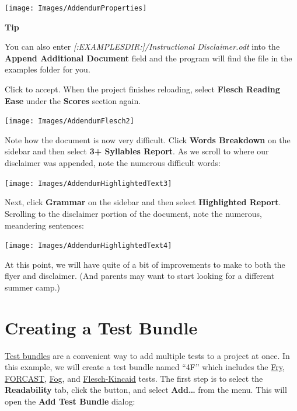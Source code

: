 \documentclass[
]{book}
\newenvironment{tipsection}
    {
    \begin{tcolorbox}[colframe=lightgray,colback=lightyellow,arc=3mm]
    \faLightbulb[regular] \textbf{Tip} \newline
    }
    {
    \end{tcolorbox}
    }
\theoremstyle{definition}
\theoremstyle{definition}
\theoremstyle{definition}
\theoremstyle{definition}
\theoremstyle{remark}
\begin{document}
\begin{center}\texttt{[image: Images/AddendumProperties]} \end{center}

\begin{tipsection}
You can also enter \emph{{[}:EXAMPLESDIR:{]}/Instructional Disclaimer.odt} into the \textbf{Append Additional Document} field and the program will find the file in the examples folder for you.

\end{tipsection}

Click  to accept. When the project finishes reloading, select \textbf{Flesch Reading Ease} under the \textbf{Scores} section again.

\begin{center}\texttt{[image: Images/AddendumFlesch2]} \end{center}

Note how the document is now very difficult. Click \textbf{Words Breakdown} on the sidebar and then select \textbf{3+ Syllables Report}. As we scroll to where our disclaimer was appended, note the numerous difficult words:

\begin{center}\texttt{[image: Images/AddendumHighlightedText3]} \end{center}

Next, click \textbf{Grammar} on the sidebar and then select \textbf{Highlighted Report}. Scrolling to the disclaimer portion of the document, note the numerous, meandering sentences:

\begin{center}\texttt{[image: Images/AddendumHighlightedText4]} \end{center}

At this point, we will have quite of a bit of improvements to make to both the flyer and disclaimer. (And parents may want to start looking for a different summer camp.)

\newpage

\hypertarget{creating-a-test-bundle}{%
\section{Creating a Test Bundle}\label{creating-a-test-bundle}}

\protect\hyperlink{test-bundles}{Test bundles} are a convenient way to add multiple tests to a project at once. In this example, we will create a test bundle named ``4F'' which includes the \protect\hyperlink{fry-test}{Fry}, \protect\hyperlink{forcast-test}{FORCAST}, \protect\hyperlink{gunning-fog-test}{Fog}, and \protect\hyperlink{flesch-kincaid-test}{Flesch-Kincaid} tests. The first step is to select the \textbf{Readability} tab, click the  button, and select \textbf{Add\ldots{}} from the menu. This will open the \textbf{Add Test Bundle} dialog:
\end{document}
